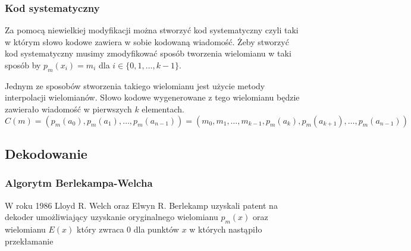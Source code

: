 \subsubsection{Kod systematyczny}
Za pomocą niewielkiej modyfikacji można stworzyć kod systematyczny czyli taki w którym słowo kodowe zawiera w sobie kodowaną wiadomość.
Żeby stworzyć kod systematyczny musimy zmodyfikować sposób tworzenia wielomianu w taki sposób by $p_m(x_i)=m_i$ dla $i \in \{0,1,\ldots,k-1\}$.

Jednym ze sposobów stworzenia takiego wielomianu jest użycie metody interpolacji wielomianów. Słowo kodowe wygenerowane z tego wielomianu będzie zawierało wiadomość w pierwszych $k$ elementach.
\[C(m)=(p_m(a_0), p_m(a_1), \ldots, p_m(a_{n-1}))=(m_0, m_1, \ldots, m_{k-1}, p_m(a_k), p_m(a_{k+1}), \ldots, p_m(a_{n-1}))\]

\subsection{Dekodowanie}
\subsubsection{Algorytm Berlekampa-Welcha}
W roku 1986 Lloyd R. Welch oraz Elwyn R. Berlekamp uzyskali patent na dekoder umożliwiający uzyskanie oryginalnego wielomianu $p_m(x)$ oraz wielomianu $E(x)$ który zwraca 0 dla punktów $x$ w których nastąpiło przekłamanie~\cite{Berlekamp-Welch}
